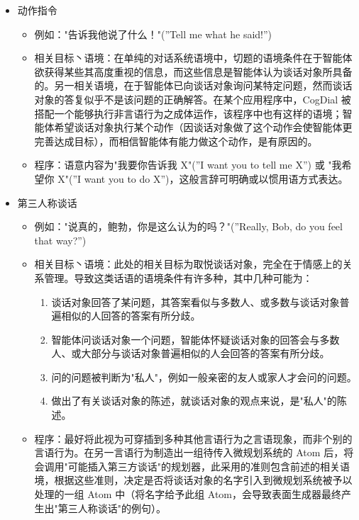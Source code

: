 \begin{itemize}
\item 动作指令
\begin{itemize}
\item 例如："告诉我他说了什么！"(”Tell me what he said!”)
\item 相关目标丶语境：在单纯的对话系统语境中，切题的语境条件在于智能体欲获得某些其高度重视的信息，而这些信息是智能体认为谈话对象所具备的。另一相关语境，在于智能体已向谈话对象询问某特定问题，然而谈话对象的答复似乎不是该问题的正确解答。在某个应用程序中，CogDial 被搭配一个能够执行非言语行为之成体运作，该程序中也有这样的语境；智能体希望谈话对象执行某个动作（因谈话对象做了这个动作会使智能体更完善达成目标），而相信智能体有能力做这个动作，是有原因的。 
\item 程序：语意内容为"我要你告诉我 X"(”I want you to tell me X”) 或 "我希望你 X"(”I want you to do X”)，这般言辞可明确或以惯用语方式表达。
\end{itemize}


\item 第三人称谈话
\begin{itemize}
\item 例如："说真的，鲍勃，你是这么认为的吗？"(”Really, Bob, do you feel that way?”)
\item 相关目标丶语境：此处的相关目标为取悦谈话对象，完全在于情感上的关系管理。导致这类话语的语境条件有许多种，其中几种可能为： 
\begin{enumerate}
\item 谈话对象回答了某问题，其答案看似与多数人、或多数与谈话对象普遍相似的人回答的答案有所分歧。
\item 智能体问谈话对象一个问题，智能体怀疑谈话对象的回答会与多数人、或大部分与谈话对象普遍相似的人会回答的答案有所分歧。 
\item 问的问题被判断为"私人"，例如一般亲密的友人或家人才会问的问题。
\item 做出了有关谈话对象的陈述，就谈话对象的观点来说，是"私人"的陈述。 
\end{enumerate}
\item 程序：最好将此视为可穿插到多种其他言语行为之言语现象，而非个别的言语行为。在另一言语行为制造出一组待传入微规划系统的 Atom 后，将会调用"可能插入第三方谈话"的规划器，此采用的准则包含前述的相关语境，根据这些准则，决定是否将谈话对象的名字引入到微规划系统被予以处理的一组 Atom 中（将名字给予此组 Atom，会导致表面生成器最终产生出"第三人称谈话"的例句）。

\end{itemize}
\end{itemize}

